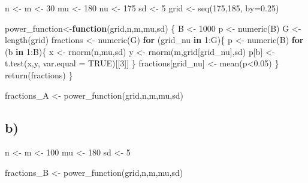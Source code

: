\documentclass[
]{article}
\newenvironment{Shaded}{\begin{snugshade}}{\end{snugshade}}
\newcommand{\AttributeTok}[1]{\textcolor[rgb]{0.77,0.63,0.00}{#1}}
\newcommand{\ConstantTok}[1]{\textcolor[rgb]{0.00,0.00,0.00}{#1}}
\newcommand{\ControlFlowTok}[1]{\textcolor[rgb]{0.13,0.29,0.53}{\textbf{#1}}}
\newcommand{\DecValTok}[1]{\textcolor[rgb]{0.00,0.00,0.81}{#1}}
\newcommand{\FloatTok}[1]{\textcolor[rgb]{0.00,0.00,0.81}{#1}}
\newcommand{\FunctionTok}[1]{\textcolor[rgb]{0.00,0.00,0.00}{#1}}
\newcommand{\NormalTok}[1]{#1}
\newcommand{\OtherTok}[1]{\textcolor[rgb]{0.56,0.35,0.01}{#1}}
\newcommand{\SpecialCharTok}[1]{\textcolor[rgb]{0.00,0.00,0.00}{#1}}
\begin{document}
\begin{Shaded}
\begin{Highlighting}[]
\NormalTok{n }\OtherTok{\textless{}{-}}\NormalTok{ m }\OtherTok{\textless{}{-}} \DecValTok{30}
\NormalTok{mu }\OtherTok{\textless{}{-}} \DecValTok{180}
\NormalTok{nu }\OtherTok{\textless{}{-}} \DecValTok{175}
\NormalTok{sd }\OtherTok{\textless{}{-}} \DecValTok{5}
\NormalTok{grid }\OtherTok{\textless{}{-}} \FunctionTok{seq}\NormalTok{(}\DecValTok{175}\NormalTok{,}\DecValTok{185}\NormalTok{, }\AttributeTok{by=}\FloatTok{0.25}\NormalTok{)}

\NormalTok{power\_function}\OtherTok{\textless{}{-}}\ControlFlowTok{function}\NormalTok{(grid,n,m,mu,sd) \{}
\NormalTok{  B }\OtherTok{\textless{}{-}} \DecValTok{1000}
\NormalTok{  p }\OtherTok{\textless{}{-}} \FunctionTok{numeric}\NormalTok{(B)}
\NormalTok{  G }\OtherTok{\textless{}{-}} \FunctionTok{length}\NormalTok{(grid)}
\NormalTok{  fractions }\OtherTok{\textless{}{-}} \FunctionTok{numeric}\NormalTok{(G)}
  \ControlFlowTok{for}\NormalTok{ (grid\_nu }\ControlFlowTok{in} \DecValTok{1}\SpecialCharTok{:}\NormalTok{G)\{}
\NormalTok{    p }\OtherTok{\textless{}{-}} \FunctionTok{numeric}\NormalTok{(B)}
    \ControlFlowTok{for}\NormalTok{ (b }\ControlFlowTok{in} \DecValTok{1}\SpecialCharTok{:}\NormalTok{B)\{}
\NormalTok{      x }\OtherTok{\textless{}{-}} \FunctionTok{rnorm}\NormalTok{(n,mu,sd)}
\NormalTok{      y }\OtherTok{\textless{}{-}} \FunctionTok{rnorm}\NormalTok{(m,grid[grid\_nu],sd)}
\NormalTok{      p[b] }\OtherTok{\textless{}{-}} \FunctionTok{t.test}\NormalTok{(x,y, }\AttributeTok{var.equal =} \ConstantTok{TRUE}\NormalTok{)[[}\DecValTok{3}\NormalTok{]]}
\NormalTok{    \}}
\NormalTok{    fractions[grid\_nu] }\OtherTok{\textless{}{-}} \FunctionTok{mean}\NormalTok{(p}\SpecialCharTok{\textless{}}\FloatTok{0.05}\NormalTok{)}
\NormalTok{  \}}
  \FunctionTok{return}\NormalTok{(fractions)}
\NormalTok{\}}

\NormalTok{fractions\_A }\OtherTok{\textless{}{-}} \FunctionTok{power\_function}\NormalTok{(grid,n,m,mu,sd)}
\end{Highlighting}
\end{Shaded}

\hypertarget{b}{%
\subsection{b)}\label{b}}

\begin{Shaded}
\begin{Highlighting}[]
\NormalTok{n }\OtherTok{\textless{}{-}}\NormalTok{ m }\OtherTok{\textless{}{-}} \DecValTok{100}
\NormalTok{mu }\OtherTok{\textless{}{-}} \DecValTok{180}
\NormalTok{sd }\OtherTok{\textless{}{-}} \DecValTok{5}

\NormalTok{fractions\_B }\OtherTok{\textless{}{-}} \FunctionTok{power\_function}\NormalTok{(grid,n,m,mu,sd)}
\end{Highlighting}
\end{Shaded}
\end{document}
